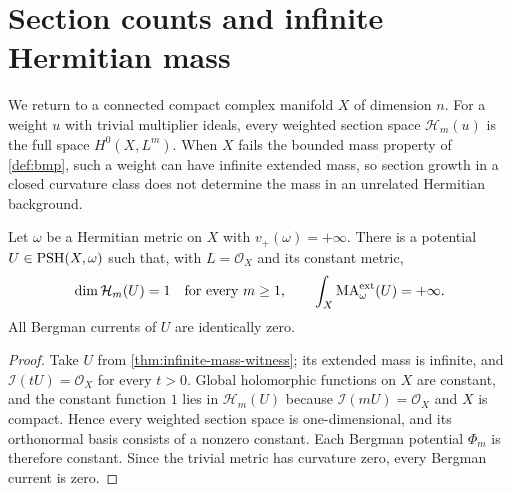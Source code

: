 

\section{Section counts and infinite Hermitian mass}

We return to a connected compact complex manifold $X$ of dimension $n$. For a weight $u$ with trivial multiplier ideals, every weighted section space $\mathcal H_m(u)$ is the full space $H^0(X,L^m)$. When $X$ fails the bounded mass property of \cref{def:bmp}, such a weight can have infinite extended mass, so section growth in a closed curvature class does not determine the mass in an unrelated Hermitian background.

\begin{proposition}\label{prop:sections-infinite-mass-obstruction}
Let $\omega$ be a Hermitian metric on $X$ with $v_+(\omega)=+\infty$. There is a potential $U\in\mathrm{PSH}(X,\omega)$ such that, with $L=\mathcal O_X$ and its constant metric,
\[
 \dim\mathcal H_m(U)=1\quad\hbox{for every }m\geq1,
 \qquad \int_X\mathrm{MA}^{\mathrm{ext}}_\omega(U)=+\infty.
\]
All Bergman currents of $U$ are identically zero.
\end{proposition}
\begin{proof}
Take $U$ from \cref{thm:infinite-mass-witness}; its extended mass is infinite, and $\mathcal I(tU)=\mathcal O_X$ for every $t>0$. Global holomorphic functions on $X$ are constant, and the constant function $1$ lies in $\mathcal H_m(U)$ because $\mathcal I(mU)=\mathcal O_X$ and $X$ is compact. Hence every weighted section space is one-dimensional, and its orthonormal basis consists of a nonzero constant. Each Bergman potential $\Phi_m$ is therefore constant. Since the trivial metric has curvature zero, every Bergman current is zero.
\end{proof}
